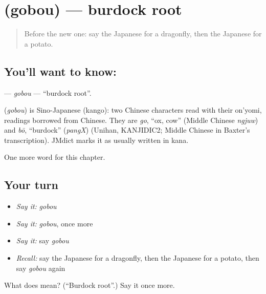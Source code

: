 \section[\texorpdfstring{\ja{ごぼう} (gobou)}{ごぼう (gobou)}]{ (gobou) — burdock root}

\label{lesson:JA-C65-gobou}



\begin{quote}
Before the new one: say the Japanese for a dragonfly, then the Japanese for a potato.
\end{quote}

\subsection*{You'll want to know: }
\textbf{} — \emph{gobou} — \textquotedblleft{}burdock root\textquotedblright{}.

\begin{cousinweb}
\textbf{} (\emph{gobou}) is Sino-Japanese (kango): two Chinese characters read with their on'yomi, readings borrowed from Chinese. They are \emph{go}, \textquotedblleft{}ox, cow\textquotedblright{} (Middle Chinese \emph{ngjuw}) and \emph{bō}, \textquotedblleft{}burdock\textquotedblright{} (\emph{pangX}) (Unihan, KANJIDIC2; Middle Chinese in Baxter's transcription). JMdict marks it as usually written in kana.
\end{cousinweb}

\begin{grammarlens}[title={What you've built}]
One more word for this chapter.
\end{grammarlens}

\subsection*{Your turn}
\begin{itemize}
\raggedright
  \item \emph{Say it:} \emph{gobou}
  \item \emph{Say it:} \emph{gobou}, once more
  \item \emph{Say it:} say \emph{gobou}
  \item \emph{Recall:} say the Japanese for a dragonfly, then the Japanese for a potato, then say \emph{gobou} again
\end{itemize}

\begin{tcolorbox}[breakable,colback=teal!4,colframe=teal!35!black,title={Before you move on}]
What does  mean? (\textquotedblleft{}Burdock root\textquotedblright{}.) Say it once more.
\end{tcolorbox}
